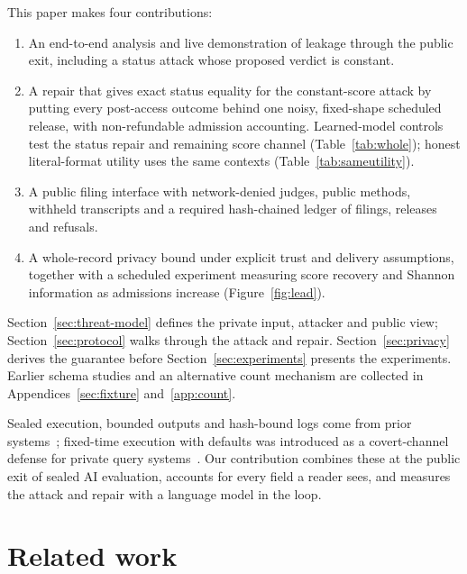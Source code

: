 \documentclass[10pt,twocolumn]{article}
\begin{document}
This paper makes four contributions:
\begin{enumerate}
\item An end-to-end analysis and live demonstration of leakage through the public exit, including a status attack whose proposed verdict is constant.
\item A repair that gives exact status equality for the constant-score attack by putting every post-access outcome behind one noisy, fixed-shape scheduled release, with non-refundable admission accounting. Learned-model controls test the status repair and remaining score channel (Table~\ref{tab:whole}); honest literal-format utility uses the same contexts (Table~\ref{tab:sameutility}).
\item A public filing interface with network-denied judges, public methods, withheld transcripts and a required hash-chained ledger of filings, releases and refusals.
\item A whole-record privacy bound under explicit trust and delivery assumptions, together with a scheduled experiment measuring score recovery and Shannon information as admissions increase (Figure~\ref{fig:lead}).
\end{enumerate}

Section~\ref{sec:threat-model} defines the private input, attacker and public view; Section~\ref{sec:protocol} walks through the attack and repair. Section~\ref{sec:privacy} derives the guarantee before Section~\ref{sec:experiments} presents the experiments. Earlier schema studies and an alternative count mechanism are collected in Appendices~\ref{sec:fixture} and~\ref{app:count}.

Sealed execution, bounded outputs and hash-bound logs come from prior systems~\cite{attestable,doubleblind,averi,truce,zkaudit,south}; fixed-time execution with defaults was introduced as a covert-channel defense for private query systems~\cite{haeberlen}. Our contribution combines these at the public exit of sealed AI evaluation, accounts for every field a reader sees, and measures the attack and repair with a language model in the loop.

\section{Related work}
\end{document}
